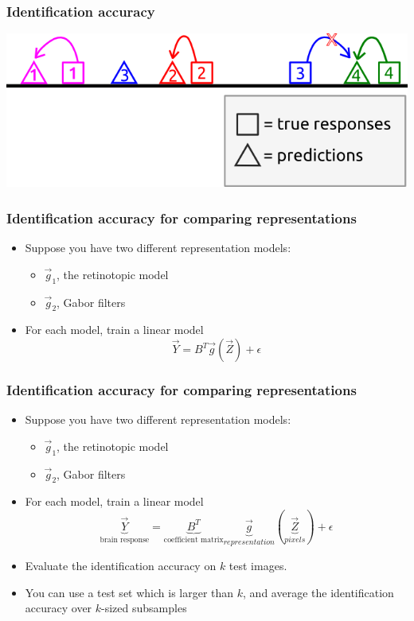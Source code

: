\documentclass{beamer}
\begin{document}
\begin{frame}
\frametitle{Identification accuracy}
\begin{center}
\includegraphics[scale = 0.5]{../diagram/idloss2b.png}
\end{center}
\end{frame}

\begin{frame}
\frametitle{Identification accuracy for comparing representations}
\begin{itemize}
\item Suppose you have two different representation models:
\begin{itemize}
\item $\vec{g}_1$, the retinotopic model
\item $\vec{g}_2$, Gabor filters \pause
\end{itemize}
\item For each model, train a linear model
\[
\vec{Y} = B^T \vec{g}(\vec{Z}) + \epsilon
\]
\end{itemize}
\vspace{1.01in}
\end{frame}

\begin{frame}
\frametitle{Identification accuracy for comparing representations}
\begin{itemize}
\item Suppose you have two different representation models:
\begin{itemize}
\item $\vec{g}_1$, the retinotopic model
\item $\vec{g}_2$, Gabor filters
\end{itemize}
\item For each model, train a linear model
\[
\underbrace{\vec{Y}}_{\text{brain response}} = \underbrace{B^T}_{\text{coefficient matrix}} \underbrace{\vec{g}}_{representation}(\underbrace{\vec{Z}}_{pixels}) + \epsilon
\]
\pause
\item Evaluate the identification accuracy on $k$ test images. \pause
\item You can use a test set which is larger than $k$, and average the identification accuracy over $k$-sized subsamples
\end{itemize}
\end{frame}
\end{document}
